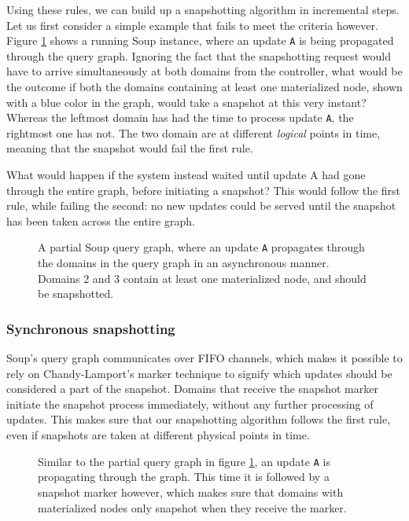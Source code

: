 \documentclass[b5paper]{report}
\begin{document}
Using these rules, we can build up a snapshotting algorithm in incremental
steps. Let us first consider a simple example that fails to meet the criteria
however. Figure \ref{bad-example} shows a running Soup instance, where an update
\texttt{A} is being propagated through the query graph. Ignoring the fact that
the snapshotting request would have to arrive simultaneously at both domains
from the controller, what would be the outcome if both the domains containing at
least one materialized node, shown with a blue color in the graph, would take
a snapshot at this very instant? Whereas the leftmost domain has had the time to
process update \texttt{A}, the rightmost one has not. The two domain are at
different \textit{logical} points in time, meaning that the snapshot would fail
the first rule.

What would happen if the system instead waited until update A had gone through
the entire graph, before initiating a snapshot? This would follow the first
rule, while failing the second: no new updates could be served until the
snapshot has been taken across the entire graph.

\begin{figure}[H]
  \centering
  
  \caption{
    A partial Soup query graph, where an update \texttt{A} propagates through
    the domains in the query graph in an asynchronous manner. Domains 2 and 3
    contain at least one materialized node, and should be snapshotted.
    \label{bad-example}
  }
\end{figure}

\subsubsection{Synchronous snapshotting}
Soup's query graph communicates over FIFO channels, which makes it possible to
rely on Chandy-Lamport's marker technique to signify which updates should be
considered a part of the snapshot. Domains that receive the snapshot marker
initiate the snapshot process immediately, without any further processing of
updates. This makes sure that our snapshotting algorithm follows the first rule,
even if snapshots are taken at different physical points in time.

\begin{figure}[H]
  \centering
  
  \caption{
    Similar to the partial query graph in figure \ref{bad-example}, an update
    \texttt{A} is propagating through the graph. This time it is followed by a
    snapshot marker however, which makes sure that domains with materialized
    nodes only snapshot when they receive the marker.
    \label{good-example}
  }
\end{figure}
\end{document}

